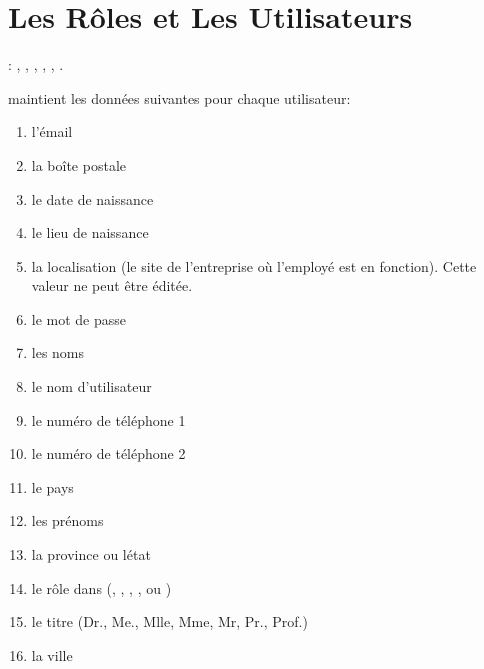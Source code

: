 \chapter{Les R\^oles et Les Utilisateurs}\label{chap:utilisateurs}

\utilisateurs: \lienadmin, \liencaissier, \liengestionnairedesstocks,
		       \lienmagasinier, \lienmanager, \lienvendeur.\\


\label{sec:utilisateurs-introduction}

\yeroth maintient les donn\'ees suivantes pour chaque utilisateur:
\begin{enumerate}[1)]
	\item l'\'email 
	\item la bo\^ite postale
	\item le date de naissance 
	\item le lieu de naissance 
	\item la localisation (le site de l'entreprise o\`u l'employ\'e
	      est en fonction). Cette valeur ne peut \^etre \'edit\'ee.
	\item le mot de passe \obligatoire
	\item les noms \obligatoire
	\item le nom d'utilisateur \obligatoire
	\item le num\'ero de t\'el\'ephone 1 
	\item le num\'ero de t\'el\'ephone 2 
	\item le pays 
	\item les pr\'enoms \obligatoire
	\item la province ou l\'etat
	\item le r\^ole dans \yeroth (\admin, \caissier, \magasinier, \manager, ou \vendeur) \obligatoire
	\item le titre (Dr., Me., Mlle, Mme, Mr, Pr., Prof.) \obligatoire
	\item la ville 
\end{enumerate}

\newpage



\newpage



\newpage



\newpage



\newpage


	
\newpage


